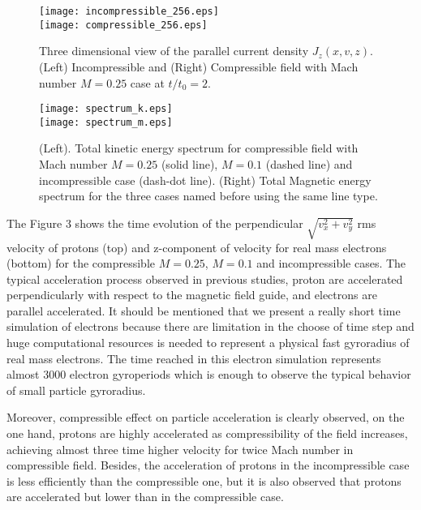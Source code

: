 \documentclass[11pt,twocolumn]{article}
\begin{document}
\begin{figure}[h!]
\begin{center}
{\texttt{[image: incompressible\_256.eps]}}\\
{\texttt{[image: compressible\_256.eps]}}
\caption{Three dimensional view of the parallel current density $J_z(x,v,z)$. (Left) Incompressible and 
(Right) Compressible field with Mach number $M=0.25$ case at $t/t_0 =2$.}
\end{center}
\end{figure}


\begin{figure}[h!]
\begin{center}
{\texttt{[image: spectrum\_k.eps]}}\\
{\texttt{[image: spectrum\_m.eps]}}
\caption{(Left). Total kinetic energy spectrum for compressible field with Mach number $M=0.25$ (solid line), $M=0.1$ (dashed line) and incompressible case (dash-dot line). (Right) Total Magnetic energy spectrum for the three cases named before using the same line type.}
\end{center}
\label{mean square velocity}
\end{figure}

The Figure 3 shows the time evolution of the perpendicular $\sqrt{v_x^2+v_y^2}$ rms velocity of protons (top) and z-component of velocity for real mass electrons (bottom) for the compressible $M=0.25$, $M=0.1$ and incompressible cases. The typical acceleration process observed in previous studies, proton are accelerated perpendicularly with respect to the magnetic field guide, and electrons are parallel accelerated. It should be mentioned that we present a really short time simulation of electrons because there are limitation in the choose of time step and huge computational resources is needed to represent a physical fast gyroradius of real mass electrons. The time reached in this electron simulation represents almost 3000 electron gyroperiods which is enough to observe the typical behavior of small particle gyroradius.

Moreover, compressible effect on particle acceleration is clearly observed, on the one hand, protons are highly accelerated as compressibility of the field increases, achieving almost three time higher velocity for twice Mach number in compressible field. Besides, the acceleration of protons in the incompressible case is less efficiently than the compressible one, but it is also observed that protons are accelerated but lower than in the compressible case.
\end{document}
